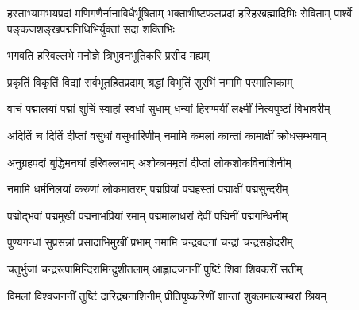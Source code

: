 
%
%
%
%

{हस्ताभ्यामभयप्रदां मणिगणैर्नानाविधैर्भूषिताम्}
{भक्ताभीष्टफलप्रदां हरिहरब्रह्मादिभिः सेविताम्}
{पार्श्वे पङ्कजशङ्खपद्मनिधिभिर्युक्तां सदा शक्तिभिः}

{भगवति हरिवल्लभे मनोज्ञे त्रिभुवनभूतिकरि प्रसीद मह्यम्}

\resetShloka
\twolineshloka
{प्रकृतिं विकृतिं विद्यां सर्वभूतहितप्रदाम्}
{श्रद्धां विभूतिं सुरभिं नमामि परमात्मिकाम्}

\twolineshloka
{वाचं पद्मालयां पद्मां शुचिं स्वाहां स्वधां सुधाम्}
{धन्यां हिरण्मयीं लक्ष्मीं नित्यपुष्टां विभावरीम्}

\twolineshloka
{अदितिं च दितिं दीप्तां वसुधां वसुधारिणीम्}
{नमामि कमलां कान्तां कामाक्षीं क्रोधसम्भवाम्}

\twolineshloka
{अनुग्रहपदां बुद्धिमनघां हरिवल्लभाम्}
{अशोकाममृतां दीप्तां लोकशोकविनाशिनीम्}

\twolineshloka
{नमामि धर्मनिलयां करुणां लोकमातरम्}
{पद्मप्रियां पद्महस्तां पद्माक्षीं पद्मसुन्दरीम्}

\twolineshloka
{पद्मोद्भवां पद्ममुखीं पद्मनाभप्रियां रमाम्}
{पद्ममालाधरां देवीं पद्मिनीं पद्मगन्धिनीम्}

\twolineshloka
{पुण्यगन्धां सुप्रसन्नां प्रसादाभिमुखीं प्रभाम्}
{नमामि चन्द्रवदनां चन्द्रां चन्द्रसहोदरीम्}

\twolineshloka
{चतुर्भुजां चन्द्ररूपामिन्दिरामिन्दुशीतलाम्}
{आह्लादजननीं पुष्टिं शिवां शिवकरीं सतीम्}

\twolineshloka
{विमलां विश्वजननीं तुष्टिं दारिद्र्यनाशिनीम्}
{प्रीतिपुष्करिणीं शान्तां शुक्लमाल्याम्बरां श्रियम्}

